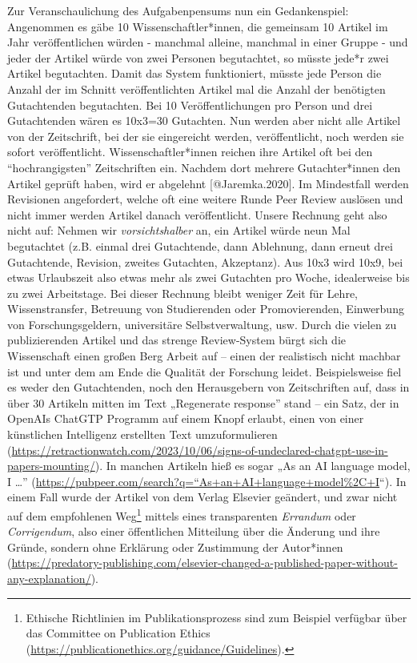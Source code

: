 \documentclass[
  letterpaper,
  DIV=11,
  numbers=noendperiod]{scrreprt}
\begin{document}
Zur Veranschaulichung des Aufgabenpensums nun ein Gedankenspiel:
Angenommen es gäbe 10 Wissenschaftler*innen, die gemeinsam 10 Artikel im
Jahr veröffentlichen würden - manchmal alleine, manchmal in einer Gruppe
- und jeder der Artikel würde von zwei Personen begutachtet, so müsste
jede*r zwei Artikel begutachten. Damit das System funktioniert, müsste
jede Person die Anzahl der im Schnitt veröffentlichten Artikel mal die
Anzahl der benötigten Gutachtenden begutachten. Bei 10
Veröffentlichungen pro Person und drei Gutachtenden wären es 10x3=30
Gutachten. Nun werden aber nicht alle Artikel von der Zeitschrift, bei
der sie eingereicht werden, veröffentlicht, noch werden sie sofort
veröffentlicht. Wissenschaftler*innen reichen ihre Artikel oft bei den
``hochrangigsten'' Zeitschriften ein. Nachdem dort mehrere
Gutachter*innen den Artikel geprüft haben, wird er abgelehnt
{[}@Jaremka.2020{]}. Im Mindestfall werden Revisionen angefordert,
welche oft eine weitere Runde Peer Review auslösen und nicht immer
werden Artikel danach veröffentlicht. Unsere Rechnung geht also nicht
auf: Nehmen wir \emph{vorsichtshalber} an, ein Artikel würde neun Mal
begutachtet (z.B. einmal drei Gutachtende, dann Ablehnung, dann erneut
drei Gutachtende, Revision, zweites Gutachten, Akzeptanz). Aus 10x3 wird
10x9, bei etwas Urlaubszeit also etwas mehr als zwei Gutachten pro
Woche, idealerweise bis zu zwei Arbeitstage. Bei dieser Rechnung bleibt
weniger Zeit für Lehre, Wissenstransfer, Betreuung von Studierenden oder
Promovierenden, Einwerbung von Forschungsgeldern, universitäre
Selbstverwaltung, usw. Durch die vielen zu publizierenden Artikel und
das strenge Review-System bürgt sich die Wissenschaft einen großen Berg
Arbeit auf -- einen der realistisch nicht machbar ist und unter dem am
Ende die Qualität der Forschung leidet. Beispielsweise fiel es weder den
Gutachtenden, noch den Herausgebern von Zeitschriften auf, dass in über
30 Artikeln mitten im Text „Regenerate response'' stand -- ein Satz, der
in OpenAIs ChatGTP Programm auf einem Knopf erlaubt, einen von einer
künstlichen Intelligenz erstellten Text umzuformulieren
(\url{https://retractionwatch.com/2023/10/06/signs-of-undeclared-chatgpt-use-in-papers-mounting/}).
In manchen Artikeln hieß es sogar „As an AI language model, I \ldots''
(\href{https://pubpeer.com/search?q=\%22As+an+AI+language+model\%2C+I}{https://pubpeer.com/search?q=``As+an+AI+language+model\%2C+I}``).
In einem Fall wurde der Artikel von dem Verlag Elsevier geändert, und
zwar nicht auf dem empfohlenen Weg\footnote{Ethische Richtlinien im
  Publikationsprozess sind zum Beispiel verfügbar über das Committee on
  Publication Ethics
  (\url{https://publicationethics.org/guidance/Guidelines}).} mittels
eines transparenten \emph{Errandum} oder \emph{Corrigendum}, also einer
öffentlichen Mitteilung über die Änderung und ihre Gründe, sondern ohne
Erklärung oder Zustimmung der Autor*innen
(\url{https://predatory-publishing.com/elsevier-changed-a-published-paper-without-any-explanation/}).
\end{document}
